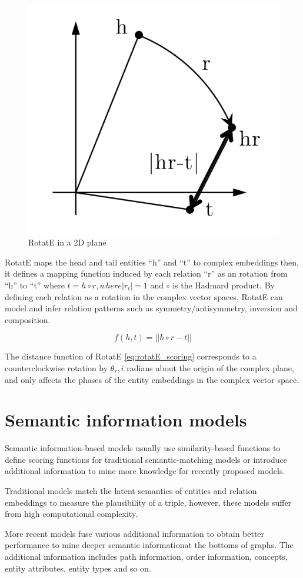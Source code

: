 \begin{figure}[!htp]
    \centering
    \includegraphics[width=.4\textwidth]{fig/embeddings/RotatE.png}
    \caption{RotatE in a 2D plane}
    \label{fig:emb-rotatE}
\end{figure}

RotatE maps the head and tail entities ``h'' and ``t'' to complex embeddings then, it defines a mapping function induced by each relation ``r'' as an rotation from ``h'' to ``t'' where $t = h \circ r, where |r_i| = 1$ and $\circ$ is the Hadmard product.
By defining each relation as a rotation in the complex vector spaces, RotatE can model and infer relation patterns such as symmetry/antisymmetry, inversion and composition. 

\begin{equation}
    \label{eq:rotatE_scoring}
    f(h, t) = ||h \circ r - t||
\end{equation}

The distance function of RotatE \ref{eq:rotatE_scoring} corresponds to a counterclockwise rotation by $\theta_r,i$ radians about the origin of the complex plane, and only affects the phases of the entity embeddings in the complex vector space.


\section{Semantic information models}\label{sec:emb-semantic}
Semantic information-based models usually use similarity-based functions to define scoring functions for traditional semantic-matching models or introduce additional information to mine more knowledge for recently proposed models.

Traditional models match the latent semantics of entities and relation embeddings to measure the plausibility of a triple, however, these models suffer from high computational complexity.

More recent models fuse various additional information to obtain better performance to mine deeper semantic informationat the bottoms of graphs. The additional information includes path information, order information, concepts, entity attributes, entity types and so on.


